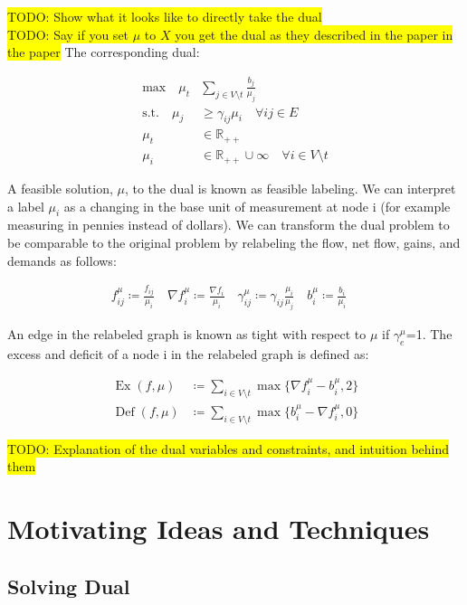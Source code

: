 \documentclass[12pt]{article}
\theoremstyle{definition}
\newcommand{\R}{\mathbb{R}}
\newcommand{\fu}{f^{\mu}}
\newcommand{\nfiu}{\nabla \fu_i}
\newcommand{\biu}{b_{i}^{\mu}}
\DeclareMathOperator{\Ex}{Ex}
\DeclareMathOperator{\Def}{Def}
\newcommand{\todo}[1]{\colorbox{yellow}{TODO: #1}}
\begin{document}
\todo{Show what it looks like to directly take the dual}\\
\todo{Say if you set $\mu$ to $X$ you get the dual as they described in the paper in the paper}
\noindent The corresponding dual:
 
        \begin{align*}\tag{D}
        \text{max} \quad
        \mu_t &\sum_{j \in V \setminus t} \frac{b_j}{\mu_j}  \\
        \text{s.t.} \quad
        \mu_j &\geq \gamma_{ij}\mu_i \quad \forall ij \in E \\
        \mu_t &\in \R_{++} \\
        \mu_i &\in \R_{++} \cup \infty \quad \forall i \in V \setminus t
        \end{align*}  
        
A feasible solution, $\mu$, to the dual is known as feasible labeling. We can interpret a label $\mu_i$ as a changing in the base unit of measurement  at node i (for example measuring in pennies instead of dollars). We can transform the dual problem to be comparable to the original problem by relabeling the flow, net flow, gains, and demands as follows:

\begin{align*}
f_{ij}^\mu \coloneqq \frac{f_{ij}}{\mu_i} \quad
\nabla f_i^\mu \coloneqq \frac{\nabla f_i }{\mu_i} \quad
\gamma_{ij}^\mu \coloneqq \gamma_{ij} \frac{\mu_i}{\mu_j} \quad
b_i^\mu \coloneqq \frac{b_i}{\mu_i} \quad
\end{align*}

An edge in the relabeled graph is known as tight with respect to $\mu$ if $\gamma_e^\mu$=1. The excess and deficit of a node i in the relabeled graph is defined as:


\begin{align*}
\Ex(f,\mu)  &\coloneqq \sum_{i \in V \setminus t} \max \{ \nfiu - \biu, 2 \} \\
\Def(f,\mu) &\coloneqq \sum_{i \in V \setminus t} \max \{ \biu - \nfiu, 0 \}
\end{align*}

\todo{Explanation of the dual variables and constraints, and intuition behind them}
  
\section{Motivating Ideas and Techniques}
	\subsection{Solving Dual}
            
\end{document}

